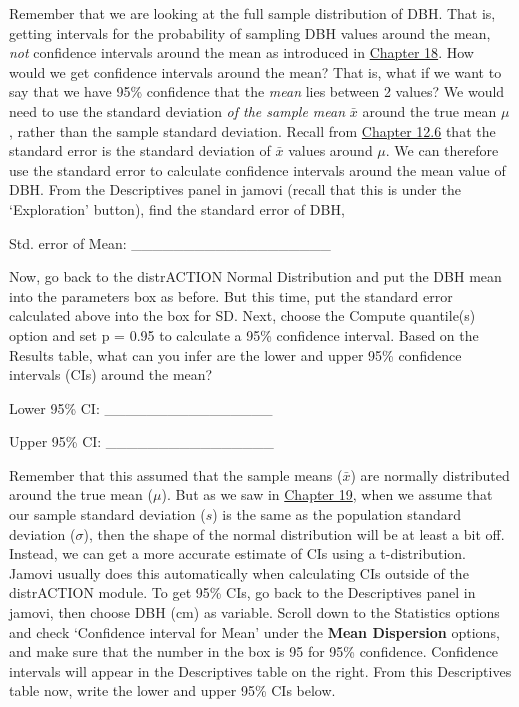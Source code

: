 \documentclass[
]{scrbook}
\begin{document}
Remember that we are looking at the full sample distribution of DBH.
That is, getting intervals for the probability of sampling DBH values around the mean, \emph{not} confidence intervals around the mean as introduced in \protect\hyperlink{Chapter_18}{Chapter 18}.
How would we get confidence intervals around the mean?
That is, what if we want to say that we have 95\% confidence that the \emph{mean} lies between 2 values?
We would need to use the standard deviation \emph{of the sample mean} \(\bar{x}\) around the true mean \(\mu\), rather than the sample standard deviation.
Recall from \href{Chapter_12.html\#the-standard-error}{Chapter 12.6} that the standard error is the standard deviation of \(\bar{x}\) values around \(\mu\).
We can therefore use the standard error to calculate confidence intervals around the mean value of DBH.
From the Descriptives panel in jamovi (recall that this is under the `Exploration' button), find the standard error of DBH,

Std. error of Mean: \_\_\_\_\_\_\_\_\_\_\_\_\_\_\_\_\_\_\_

Now, go back to the distrACTION Normal Distribution and put the DBH mean into the parameters box as before.
But this time, put the standard error calculated above into the box for SD.
Next, choose the Compute quantile(s) option and set p = 0.95 to calculate a 95\% confidence interval.
Based on the Results table, what can you infer are the lower and upper 95\% confidence intervals (CIs) around the mean?

Lower 95\% CI: \_\_\_\_\_\_\_\_\_\_\_\_\_\_\_\_

Upper 95\% CI: \_\_\_\_\_\_\_\_\_\_\_\_\_\_\_\_

Remember that this assumed that the sample means (\(\bar{x}\)) are normally distributed around the true mean (\(\mu\)).
But as we saw in \protect\hyperlink{Chapter_19}{Chapter 19}, when we assume that our sample standard deviation (\(s\)) is the same as the population standard deviation (\(\sigma\)), then the shape of the normal distribution will be at least a bit off.
Instead, we can get a more accurate estimate of CIs using a t-distribution.
Jamovi usually does this automatically when calculating CIs outside of the distrACTION module.
To get 95\% CIs, go back to the Descriptives panel in jamovi, then choose DBH (cm) as variable.
Scroll down to the Statistics options and check `Confidence interval for Mean' under the \textbf{Mean Dispersion} options, and make sure that the number in the box is 95 for 95\% confidence.
Confidence intervals will appear in the Descriptives table on the right.
From this Descriptives table now, write the lower and upper 95\% CIs below.
\end{document}
